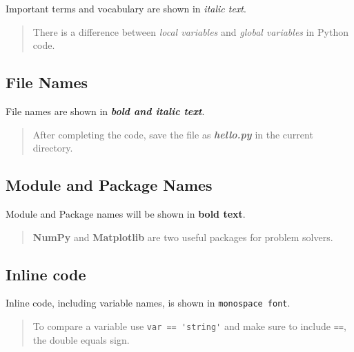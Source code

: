 \documentclass{book}
\newcommand{\passthrough}[1]{#1}
\begin{document}
Important terms and vocabulary are shown in \emph{italic text}.

\begin{quote}
There is a difference between \emph{local variables} and \emph{global
variables} in Python code.
\end{quote}
    




    
        \hypertarget{file-names}{%
\subsection{File Names}\label{file-names}}

File names are shown in \textbf{\emph{bold and italic text}}.

\begin{quote}
After completing the code, save the file as \textbf{\emph{hello.py}} in
the current directory.
\end{quote}
    




    
        \hypertarget{module-and-package-names}{%
\subsection{Module and Package Names}\label{module-and-package-names}}

Module and Package names will be shown in \textbf{bold text}.

\begin{quote}
\textbf{NumPy} and \textbf{Matplotlib} are two useful packages for
problem solvers.
\end{quote}
    




    
        \hypertarget{inline-code}{%
\subsection{Inline code}\label{inline-code}}

Inline code, including variable names, is shown in
\passthrough{\lstinline!monospace font!}.

\begin{quote}
To compare a variable use \passthrough{\lstinline!var == 'string'!} and
make sure to include \passthrough{\lstinline!==!}, the double equals
sign.
\end{quote}
    
\end{document}
